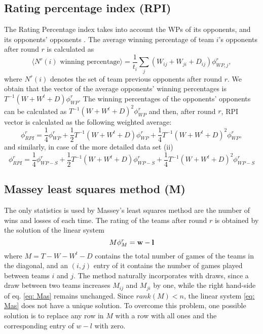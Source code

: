 \documentclass{article}
\def\vect#1{\mbox{$\bf #1$}}
\begin{document}
\subsection{Rating percentage index (RPI)}

The Rating Percentage index takes into account the WPs of its opponents, and its opponents' opponents \cite{}. The average winning percentage of team $i$'s opponents after round $r$ is calculated as
\begin{equation}\label{eq: avg-WP}
\langle N^r(i) \textrm{ winning percentage}  \rangle = \frac{1}{t_i}\sum_{j} (W_{ij}+W_{ji}+D_{ij})\phi^{r}_{WP, j},
\end{equation}
where $N^r(i)$ denotes the set of team previous opponents after round $r$. We obtain that the vector of the average opponents' winning percentages is $T^{-1}(W+W^t+D)\phi^{r}_{WP}$. The winning percentages of the opponents' opponents can be calculated as $T^{-1}(W+W^t+D)^2\phi^{r}_{WP}$ and then, after round $r$, RPI vector is calculated as the following weighted average:
\begin{equation}\label{eq: rpi}
\phi^{r}_{RPI}=\frac{1}{4}\phi^{r}_{WP}+\frac{1}{2}T^{-1}(W+W^t+D)\phi^{r}_{WP}+\frac{1}{4}T^{-1}(W+W^t+D)^2\phi^{r}_{WP},
\end{equation}
and similarly, in case of the more detailed data set (ii)
\begin{equation}\label{eq: rpiS}
\phi^{r}_{RPI}=\frac{1}{4}\phi^{r}_{WP-S}+\frac{1}{2}T^{-1}(W+W^t+D)\phi^{r}_{WP-S}+\frac{1}{4}T^{-1}(W+W^t+D)^2\phi^{r}_{WP-S}
\end{equation}

\subsection{Massey least squares method (M)}

The only statistics is used by Massey's least squares method \cite{} are the number of wins and losses of each time. The rating of the teams after round $r$ is obtained by the solution of the linear system
\begin{equation}\label{eq: Mas}
M\phi^{r}_{M}=\vect{w}-\vect{l}
\end{equation}
where $M=T-W-W^t-D$ contains the total number of games of the teams in the diagonal, and an $(i,j)$ entry of it contains the number of games played between teams $i$ and $j$. The method naturally incorporates with draws, since a draw between two teams increases $M_{ij}$ and $M_{ji}$ by one, while the right hand-side of eq. \ref{eq: Mas} remains unchanged. Since $rank(M)<n$, the linear system \ref{eq: Mas} does not have a unique solution. To overcome this problem, one possible solution is to replace any row in $M$ with a row with all ones and the corresponding entry of $w-l$ with zero.
\end{document}
